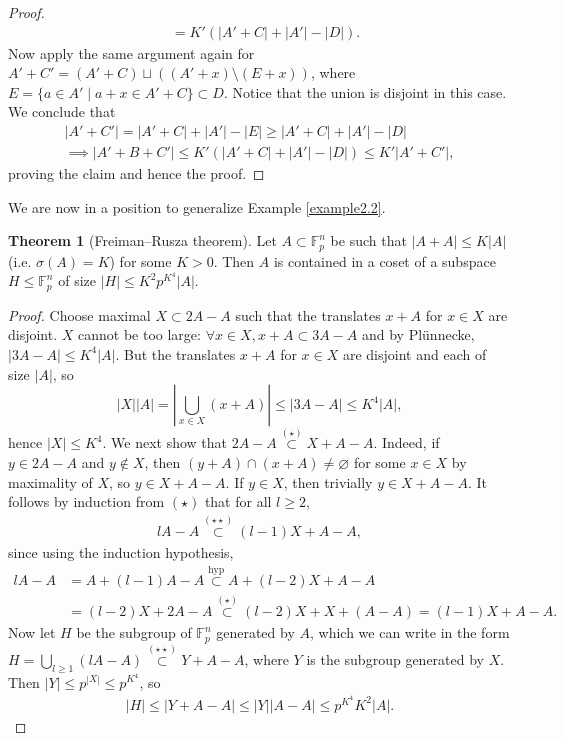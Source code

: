 \documentclass{article}
\theoremstyle{definition}
\newtheorem{theorem}{Theorem}[section]
\begin{document}
\begin{proof}
\begin{align*}
        &= K'(\left|A'+C\right|+\left|A'\right|-\left|D\right|).
    \end{align*}
    Now apply the same argument again for $A'+C' = (A' + C) \sqcup ((A'+x)\setminus (E+x))$, where $E = \{a \in A' \mid a+x \in A'+C\} \subset D$. Notice that the union is disjoint in this case. We conclude that 
    \begin{align*}
        \left|A'+C'\right| = \left|A'+C\right| + \left|A'\right| - \left|E\right| \ge \left|A'+C\right| + \left|A'\right| - \left|D\right|\\
        \implies \left|A'+B+C'\right|\le K'(\left|A'+C\right|+\left|A'\right|-\left|D\right|)\le K'\left|A'+C'\right|,
    \end{align*}
    proving the claim and hence the proof.
\end{proof}
We are now in a position to generalize Example \ref{example2.2}.
\begin{theorem}[Freiman--Rusza theorem]\label{theorem2.8}
    Let $A \subset \mathbb{F}_p^n$ be such that $\left|A+A\right|\le K\left|A\right|$ (i.e. $\sigma(A)=K$) for some $K>0$. Then $A$ is contained in a coset of a subspace $H\le \mathbb{F}_p^n$ of size $\left|H\right|\le K^2p^{K^4}\left|A\right|$.
\end{theorem}
\begin{proof}
    Choose maximal $X \subset 2A-A$ such that the translates $x+A$ for $x \in X$ are disjoint. $X$ cannot be too large: $\forall x \in X, x+A \subset 3A-A$ and by Plünnecke, $\left|3A-A\right| \le K^4\left|A\right|$. But the translates $x+A$ for $x \in X$ are disjoint and each of size $\left|A\right|$, so
    \[
    \left|X\right|\left|A\right| = \left|\bigcup_{x \in X}(x+A) \right|\le \left|3A-A\right| \le K^4\left|A\right|,
    \]
    hence $\left|X\right|\le K^4$. We next show that $2A-A \stackrel{(\star)}{\subset}  X+A-A$. Indeed, if $y \in 2A-A$ and $y \not\in X$, then $(y+A) \cap (x+A) \neq \varnothing$ for some $x \in X$ by maximality of $X$, so $y \in X+A-A$. If $y \in X$, then trivially $y \in X+A-A$. It follows by induction from $(\star)$ that for all $l\ge 2$,
    \begin{align*}
        lA-A \stackrel{(\star\star)}{\subset}  (l-1)X + A -A,
    \end{align*}
    since using the induction hypothesis,
    \begin{align*}
        lA-A &= A+(l-1)A - A \stackrel{\text{hyp}}{\subset} A + (l-2)X + A - A \\
        &= (l-2)X + 2A - A \stackrel{(\star)}{\subset } (l-2)X +X +(A-A) = (l-1)X+A-A.
    \end{align*}
    Now let $H$ be the subgroup of $\mathbb{F}_p^n$ generated by $A$, which we can write in the form $H = \bigcup_{l\ge 1}(lA-A) \stackrel{(\star\star)}{\subset} Y+A-A$, where $Y$ is the subgroup generated by $X$. Then $\left|Y\right|\le p^{\left|X\right|} \le p^{K^4}$, so
    \begin{align*}
        \left|H\right|\le \left|Y+A-A\right|\le \left|Y\right|\left|A-A\right|\le p^{K^4}K^2\left|A\right|.
    \end{align*}
\end{proof}
\end{document}
